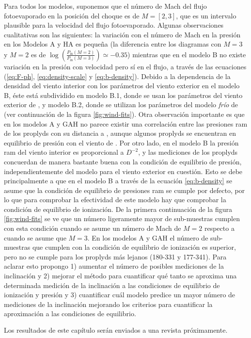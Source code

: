 Para todos los modelos, suponemos que el número de Mach del flujo fotoevaporado en la posición del choque es de $M=[2, 3]$, que es un intervalo plausible para la velocidad del flujo fotoevaporado. Algunas observaciones cualitativas son las siguientes: la variación con el número de Mach en la presión en los Modelos A y HA es pequeña (la diferencia entre los diagramas con $M=3$ y $M=2$ es de $\log\left(\frac{P_{\mathrm{in}}(M=2)}{P_{\mathrm{in}}(M=3)}\right)\simeq -0.35$) mientras que en el modelo B no existe variación en la presión con velocidad pero sí en el flujo, a través de las ecuaciones (\ref{eq:F-ph}, \ref{eq:density-scale} y \ref{eq:b-density}). Debido a la dependencia de la densidad del viento interior con los parámetros del viento exterior en el modelo B, éste está subdividido en modelo B.1, donde se usan los parámetros del viento exterior de \citet{GAH:2002}, y modelo B.2, donde se utilizan los parámetros del modelo \textit{frío} de \citet{Gagne:2005} (ver continuación de la figura \ref{fig:wind-fits}). Otra observación importante es que en los modelos A y GAH no parece existir una correlación entre las presiones ram de los proplyds con su distancia a \thC{}, aunque algunos proplyds se encuentran en equilibrio de presión con el viento de \thC{}. Por otro lado, en el modelo B la presión ram del viento interior es proporcional a $D^{-2}$, y las mediciones de los proplyds concuerdan de manera bastante buena con la condición de equilibrio de presión, independientemente del modelo para el viento exterior en cuestión. Esto se debe principalmente a que en el modelo B a través de la ecuación \ref{eq:b-density} se asume que la condición de equilibrio de presiones ram se cumple por defecto, por lo que para comprobar la efectividad de este modelo hay que comprobar la condición de equilibrio de ionización. De la primera continuación de la figura \ref{fig:wind-fits} se ve que un número ligeramente mayor de sub-muestras cumplen con esta condición cuando se asume un número de Mach de $M=2$ respecto a cuando se asume que $M=3$. En los modelos A y GAH el número de sub-muestras que cumplen con la condición de equilibrio de ionización es superior, pero no se cumple para los proplyds más lejanos (180-331 y 177-341). Para aclarar esto propongo 1) aumentar el número de posibles mediciones de la inclinación y 2) mejorar el método para cuantificar qué tanto se aproxima una determinada medición de la inclinación a las condiciones de equilibrio de ionización y presión y 3) cuantificar cuál modelo predice un mayor número de mediciones de la inclinación mejorando los criterios para cuantificar la aproximación a las condiciones de equilibrio.%

Los resultados de este capítulo serán enviados a una revista próximamente.

